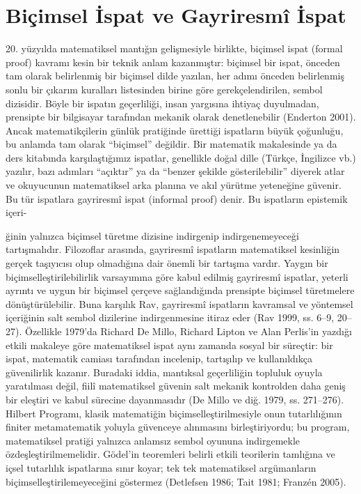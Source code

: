 \section{Biçimsel İspat ve Gayriresmî İspat}\label{sec:bicimsel}

20. yüzyılda matematiksel mantığın gelişmesiyle birlikte, biçimsel ispat (formal proof) kavramı kesin bir teknik anlam kazanmıştır: biçimsel bir ispat, önceden tam olarak belirlenmiş bir biçimsel dilde yazılan, her adımı önceden belirlenmiş sonlu bir çıkarım kuralları listesinden birine göre gerekçelendirilen, sembol dizisidir. Böyle bir ispatın geçerliliği, insan yargısına ihtiyaç duyulmadan, prensipte bir bilgisayar tarafından mekanik olarak denetlenebilir (Enderton 2001). Ancak matematikçilerin günlük pratiğinde ürettiği ispatların büyük çoğunluğu, bu anlamda tam olarak “biçimsel” değildir. Bir matematik makalesinde ya da ders kitabında karşılaştığımız ispatlar, genellikle doğal dille (Türkçe, İngilizce vb.) yazılır, bazı adımları “açıktır” ya da “benzer şekilde gösterilebilir” diyerek atlar ve okuyucunun matematiksel arka planına ve akıl yürütme yeteneğine güvenir. Bu tür ispatlara gayriresmî ispat (informal proof) denir. Bu ispatların epistemik içeri-

ğinin yalnızca biçimsel türetme dizisine indirgenip indirgenemeyeceği tartışmalıdır. Filozoflar arasında, gayriresmî ispatların matematiksel kesinliğin gerçek taşıyıcısı olup olmadığına dair önemli bir tartışma vardır. Yaygın bir biçimselleştirilebilirlik varsayımına göre kabul edilmiş gayriresmî ispatlar, yeterli ayrıntı ve uygun bir biçimsel çerçeve sağlandığında prensipte biçimsel türetmelere dönüştürülebilir. Buna karşılık Rav, gayriresmî ispatların kavramsal ve yöntemsel içeriğinin salt sembol dizilerine indirgenmesine itiraz eder (Rav 1999, ss. 6–9, 20–27). Özellikle 1979’da Richard De Millo, Richard Lipton ve Alan Perlis’in yazdığı etkili makaleye göre matematiksel ispat aynı zamanda sosyal bir süreçtir: bir ispat, matematik camiası tarafından incelenip, tartışılıp ve kullanıldıkça güvenilirlik kazanır. Buradaki iddia, mantıksal geçerliliğin topluluk oyuyla yaratılması değil, fiilî matematiksel güvenin salt mekanik kontrolden daha geniş bir eleştiri ve kabul sürecine dayanmasıdır (De Millo ve diğ. 1979, ss. 271–276). Hilbert Programı, klasik matematiğin biçimselleştirilmesiyle onun tutarlılığının finiter metamatematik yoluyla güvenceye alınmasını birleştiriyordu; bu program, matematiksel pratiği yalnızca anlamsız sembol oyununa indirgemekle özdeşleştirilmemelidir. Gödel’in teoremleri belirli etkili teorilerin tamlığına ve içsel tutarlılık ispatlarına sınır koyar; tek tek matematiksel argümanların biçimselleştirilemeyeceğini göstermez (Detlefsen 1986; Tait 1981; Franzén 2005).

